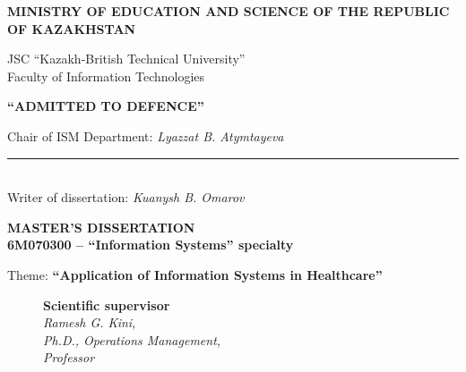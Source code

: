 \begin{titlepage}
    \pagestyle{empty}
    \begin{center}
        {\bf{\MakeUppercase{Ministry of education and science of the Republic of Kazakhstan}}

        \vspace{14pt}

        JSC ``Kazakh-British Technical University''\\
        Faculty of Information Technologies}

       \vspace{14pt}

        \begin{flushright}
            {\bf \MakeUppercase{``Admitted to defence''}}

            Chair of ISM Department: {\em Lyazzat B. Atymtayeva}\\
            \vspace{0.5\baselineskip}
            \rule{13em}{0.4pt}\\
            \vspace{14pt}
          Writer of dissertation: {\em Kuanysh B. Omarov}
          \vspace{14pt}
        \end{flushright}

        {\bf
        \MakeUppercase{Master's Dissertation}\\
        6M070300 -- ``Information Systems'' specialty}

        \vspace{14pt}

        Theme: {\bf ``Application of Information Systems in Healthcare''}

        \vspace{28pt}

        \begin{figure}[ht]
            \begin{minipage}[t]{0.6\linewidth}
                {\bf Scientific supervisor}\\

                {\em Ramesh G. Kini,\\
                Ph.D., Operations Management, \\
                Professor}\\
            \end{minipage}
        \end{figure}


\end{center}
\end{titlepage}
